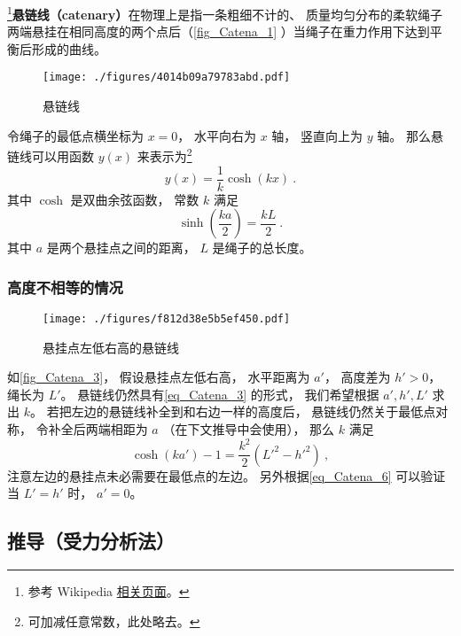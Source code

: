 

\footnote{参考 Wikipedia \href{https://en.wikipedia.org/wiki/Catenary}{相关页面}。}\textbf{悬链线（catenary）}在物理上是指一条粗细不计的、 质量均匀分布的柔软绳子两端悬挂在相同高度的两个点后（\autoref{fig_Catena_1} ）当绳子在重力作用下达到平衡后形成的曲线。

\begin{figure}[ht]
\centering
\texttt{[image: ./figures/4014b09a79783abd.pdf]}
\caption{悬链线} \label{fig_Catena_1}
\end{figure}

令绳子的最低点横坐标为 $x = 0$， 水平向右为 $x$ 轴， 竖直向上为 $y$ 轴。 那么悬链线可以用函数 $y(x)$ 来表示为\footnote{可加减任意常数，此处略去。}
\begin{equation}\label{eq_Catena_3}
y(x) = \frac{1}{k}\cosh(kx)~.
\end{equation}
其中 $\cosh$ 是双曲余弦函数， 常数 $k$ 满足
\begin{equation}\label{eq_Catena_10}
\sinh(\frac{ka}{2}) = \frac{kL}{2}~.
\end{equation}
其中 $a$ 是两个悬挂点之间的距离， $L$ 是绳子的总长度。

\subsubsection{高度不相等的情况}
\begin{figure}[ht]
\centering
\texttt{[image: ./figures/f812d38e5b5ef450.pdf]}
\caption{悬挂点左低右高的悬链线} \label{fig_Catena_3}
\end{figure}
如\autoref{fig_Catena_3}， 假设悬挂点左低右高， 水平距离为 $a'$， 高度差为 $h' > 0$， 绳长为 $L'$。 悬链线仍然具有\autoref{eq_Catena_3} 的形式， 我们希望根据 $a', h', L'$ 求出 $k$。 若把左边的悬链线补全到和右边一样的高度后， 悬链线仍然关于最低点对称， 令补全后两端相距为 $a$ （在下文推导中会使用）， 那么 $k$ 满足
\begin{equation}\label{eq_Catena_6}
\cosh(ka') - 1 = \frac{k^2}{2}(L'^2 - h'^2)~,
\end{equation}
注意左边的悬挂点未必需要在最低点的左边。 另外根据\autoref{eq_Catena_6} 可以验证当 $L' = h'$ 时， $a' = 0$。

\subsection{推导（受力分析法）}

